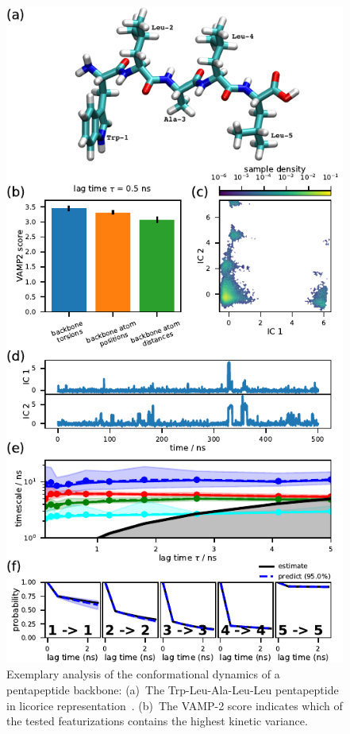 \documentclass[9pt,tutorial]{livecoms}
\begin{document}
\begin{figure}
\includegraphics{figure_2}
\caption{Exemplary analysis of the conformational dynamics of a pentapeptide backbone: (a)~The Trp-Leu-Ala-Leu-Leu pentapeptide in licorice representation~\cite{vmd}.
(b)~The VAMP-2 score indicates which of the tested featurizations contains the highest kinetic variance.
}
\end{figure}
\end{document}
